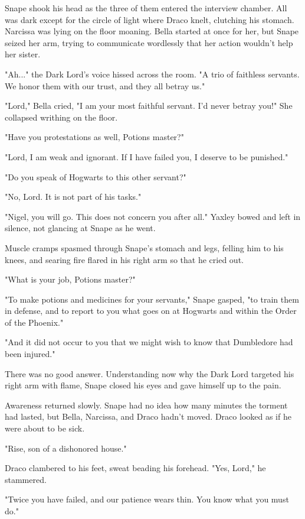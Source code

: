 \documentclass[a4paper,11pt]{article}
\begin{document}
Snape shook his head as the three of them entered the interview chamber. All was dark except for the circle of light where Draco knelt, clutching his stomach. Narcissa was lying on the floor moaning. Bella started at once for her, but Snape seized her arm, trying to communicate wordlessly that her action wouldn't help her sister.

"Ah..." the Dark Lord's voice hissed across the room. "A trio of faithless servants. We honor them with our trust, and they all betray us."

"Lord," Bella cried, "I am your most faithful servant. I'd never betray you!" She collapsed writhing on the floor.

"Have you protestations as well, Potions master?"

"Lord, I am weak and ignorant. If I have failed you, I deserve to be punished."

"Do you speak of Hogwarts to this other servant?"

"No, Lord. It is not part of his tasks."

"Nigel, you will go. This does not concern you after all." Yaxley bowed and left in silence, not glancing at Snape as he went.

Muscle cramps spasmed through Snape's stomach and legs, felling him to his knees, and searing fire flared in his right arm so that he cried out.

"What is your job, Potions master?"

"To make potions and medicines for your servants," Snape gasped, "to train them in defense, and to report to you what goes on at Hogwarts and within the Order of the Phoenix."

"And it did not occur to you that we might wish to know that Dumbledore had been injured."

There was no good answer. Understanding now why the Dark Lord targeted his right arm with flame, Snape closed his eyes and gave himself up to the pain.

Awareness returned slowly. Snape had no idea how many minutes the torment had lasted, but Bella, Narcissa, and Draco hadn't moved. Draco looked as if he were about to be sick.

"Rise, son of a dishonored house."

Draco clambered to his feet, sweat beading his forehead. "Yes, Lord," he stammered.

"Twice you have failed, and our patience wears thin. You know what you must do."
\end{document}
